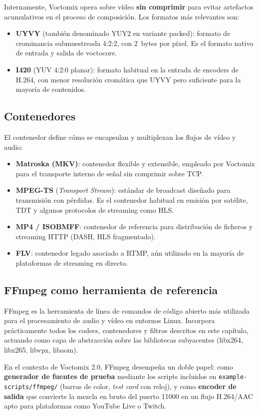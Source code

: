 Internamente, Voctomix opera sobre vídeo \textbf{sin comprimir} para evitar artefactos
acumulativos en el proceso de composición. Los formatos más relevantes son:

\begin{itemize}
  \item \textbf{UYVY} (también denominado YUY2 en variante packed): formato de crominancia
  submuestreada 4:2:2, con 2~bytes por píxel. Es el formato nativo de entrada y salida
  de voctocore.
  \item \textbf{I420} (YUV 4:2:0 planar): formato habitual en la entrada de encoders
  de H.264, con menor resolución cromática que UYVY pero suficiente para la mayoría
  de contenidos.
\end{itemize}

\subsection{Contenedores}

El contenedor define cómo se encapsulan y multiplexan los flujos de vídeo y audio:

\begin{itemize}
  \item \textbf{Matroska (MKV)}: contenedor flexible y extensible, empleado por
  Voctomix para el transporte interno de señal sin comprimir sobre TCP.
  \item \textbf{MPEG-TS} (\textit{Transport Stream}): estándar de broadcast diseñado
  para transmisión con pérdidas. Es el contenedor habitual en emisión por satélite,
  TDT y algunos protocolos de streaming como HLS.
  \item \textbf{MP4 / ISOBMFF}: contenedor de referencia para distribución de ficheros
  y streaming HTTP (DASH, HLS fragmentado).
  \item \textbf{FLV}: contenedor legado asociado a RTMP, aún utilizado en la mayoría
  de plataformas de streaming en directo.
\end{itemize}

\subsection{FFmpeg como herramienta de referencia}

FFmpeg es la herramienta de línea de comandos de código abierto más utilizada para el
procesamiento de audio y vídeo en entornos Linux. Incorpora prácticamente todos los
codecs, contenedores y filtros descritos en este capítulo, actuando como capa de
abstracción sobre las bibliotecas subyacentes (libx264, libx265, libvpx, libaom).

En el contexto de Voctomix 2.0, FFmpeg desempeña un doble papel: como
\textbf{generador de fuentes de prueba} mediante los scripts incluidos en
\texttt{example-scripts/ffmpeg/} (barras de color, \textit{test card} con reloj),
y como \textbf{encoder de salida} que convierte la mezcla en bruto del puerto 11000
en un flujo H.264/AAC apto para plataformas como YouTube Live o Twitch.
